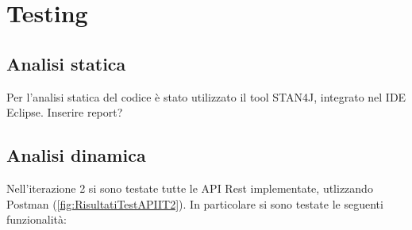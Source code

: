 \section{Testing}
\subsection{Analisi statica}
Per l'analisi statica del codice è stato utilizzato il tool STAN4J, integrato nel IDE Eclipse.
Inserire report?

\subsection{Analisi dinamica}
Nell'iterazione 2 si sono testate tutte le API Rest implementate, utlizzando Postman (\Fig \ref{fig:RisultatiTestAPIIT2}). In particolare si sono testate le seguenti funzionalità:

